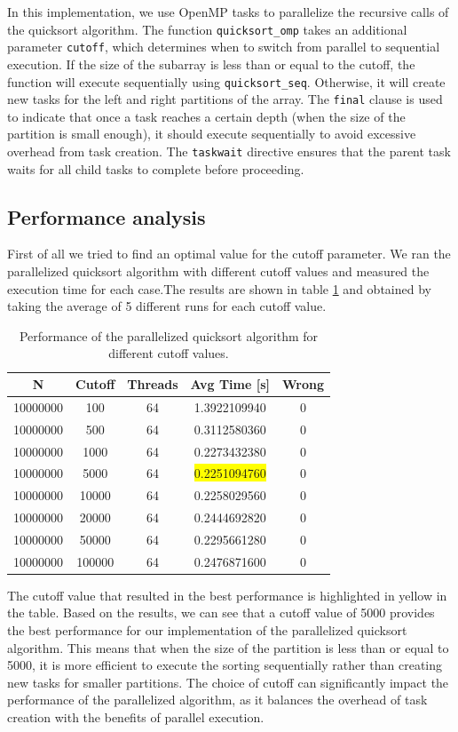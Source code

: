 \documentclass[unicode,10pt,a4paper,oneside,numbers=endperiod,openany]{scrartcl}
\begin{document}
In this implementation, we use OpenMP tasks to parallelize the recursive calls of the quicksort algorithm. The function \texttt{quicksort\_omp} takes an additional parameter \texttt{cutoff}, which determines when to switch from parallel to sequential execution. If the size of the subarray is less than or equal to the cutoff, the function will execute sequentially using \texttt{quicksort\_seq}. Otherwise, it will create new tasks for the left and right partitions of the array. The \texttt{final} clause is used to indicate that once a task reaches a certain depth (when the size of the partition is small enough), it should execute sequentially to avoid excessive overhead from task creation. The \texttt{taskwait} directive ensures that the parent task waits for all child tasks to complete before proceeding.
\subsection{Performance analysis}
First of all we tried to find an optimal value for the cutoff parameter. We ran the parallelized quicksort algorithm with different cutoff values and measured the execution time for each case.The results are shown in table \ref{tab:quicksort_cutoff} and obtained by taking the average of 5 different runs for each cutoff value. 

\begin{table}[h]
\centering
\begin{tabular}{|c|c|c|c|c|}
\hline
N & Cutoff & Threads & Avg Time [s] & Wrong \\
\hline
10000000 & 100 & 64 & 1.3922109940 & 0 \\
10000000 & 500 & 64 & 0.3112580360 & 0 \\
10000000 & 1000 & 64 & 0.2273432380 & 0 \\
10000000 & 5000 & 64 & \colorbox{yellow}{0.2251094760} & 0 \\
10000000 & 10000 & 64 & 0.2258029560 & 0 \\
10000000 & 20000 & 64 & 0.2444692820 & 0 \\
10000000 & 50000 & 64 & 0.2295661280 & 0 \\
10000000 & 100000 & 64 & 0.2476871600 & 0 \\
\hline
\end{tabular}
\caption{Performance of the parallelized quicksort algorithm for different cutoff values.}
\label{tab:quicksort_cutoff}
\end{table}

The cutoff value that resulted in the best performance is highlighted in yellow in the table. Based on the results, we can see that a cutoff value of 5000 provides the best performance for our implementation of the parallelized quicksort algorithm. This means that when the size of the partition is less than or equal to 5000, it is more efficient to execute the sorting sequentially rather than creating new tasks for smaller partitions. The choice of cutoff can significantly impact the performance of the parallelized algorithm, as it balances the overhead of task creation with the benefits of parallel execution.\\
\end{document}

